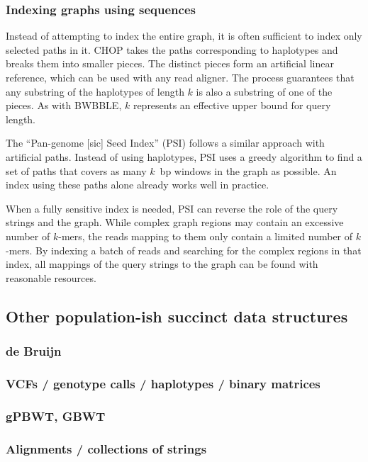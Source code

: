 \subsubsection{Indexing graphs using sequences}

Instead of attempting to index the entire graph, it is often sufficient to index only selected paths in it.
CHOP \cite{Mokveld_2018} takes the paths corresponding to haplotypes and breaks them into smaller pieces.
The distinct pieces form an artificial linear reference, which can be used with any read aligner.
The process guarantees that any substring of the haplotypes of length $k$ is also a substring of one of the pieces.
As with BWBBLE, $k$ represents an effective upper bound for query length.

The ``Pan-genome [sic] Seed Index'' (PSI) \cite{Ghaffaari_2019} follows a similar approach with artificial paths.
Instead of using haplotypes, PSI uses a greedy algorithm to find a set of paths that covers as many $k$~bp windows in the graph as possible.
An index using these paths alone already works well in practice.

When a fully sensitive index is needed, PSI can reverse the role of the query strings and the graph.
While complex graph regions may contain an excessive number of $k$-mers, the reads mapping to them only contain a limited number of $k$-mers.
By indexing a batch of reads and searching for the complex regions in that index, all mappings of the query strings to the graph can be found with reasonable resources.


\subsection{Other population-ish succinct data structures}

\subsubsection{de Bruijn}


\subsubsection{VCFs / genotype calls / haplotypes / binary matrices}

\subsubsection{gPBWT, GBWT}



\subsubsection{Alignments / collections of strings}




